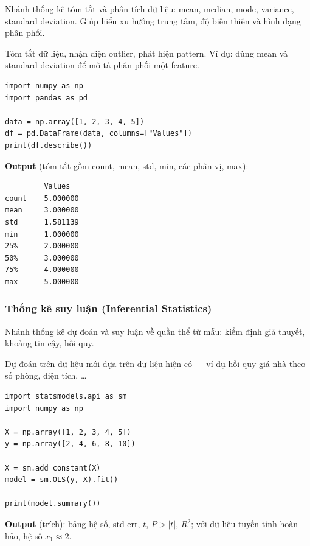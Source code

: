 \begin{ynghia}[title={Nội dung}]
Nhánh thống kê tóm tắt và phân tích dữ liệu: mean, median, mode, variance, standard deviation.
Giúp hiểu xu hướng trung tâm, độ biến thiên và hình dạng phân phối.
\end{ynghia}

\begin{phuongphap}[title={Ứng dụng trong ML}]
Tóm tắt dữ liệu, nhận diện outlier, phát hiện pattern.
Ví dụ: dùng mean và standard deviation để mô tả phân phối một feature.
\end{phuongphap}

\begin{vidu}[title={Tính thống kê mô tả với NumPy và Pandas}]
\begin{lstlisting}
import numpy as np
import pandas as pd

data = np.array([1, 2, 3, 4, 5])
df = pd.DataFrame(data, columns=["Values"])
print(df.describe())
\end{lstlisting}

\textbf{Output} (tóm tắt gồm count, mean, std, min, các phân vị, max):
\begin{lstlisting}
         Values
count    5.000000
mean     3.000000
std      1.581139
min      1.000000
25%      2.000000
50%      3.000000
75%      4.000000
max      5.000000
\end{lstlisting}
\end{vidu}

\subsubsection{Thống kê suy luận (Inferential Statistics)}

\begin{ynghia}[title={Nội dung}]
Nhánh thống kê dự đoán và suy luận về quần thể từ mẫu: kiểm định giả thuyết, khoảng tin cậy, hồi quy.
\end{ynghia}

\begin{phuongphap}[title={Ứng dụng trong ML}]
Dự đoán trên dữ liệu mới dựa trên dữ liệu hiện có --- ví dụ hồi quy giá nhà theo số phòng, diện tích, \ldots
\end{phuongphap}

\begin{vidu}[title={Hồi quy OLS với statsmodels}]
\begin{lstlisting}
import statsmodels.api as sm
import numpy as np

X = np.array([1, 2, 3, 4, 5])
y = np.array([2, 4, 6, 8, 10])

X = sm.add_constant(X)
model = sm.OLS(y, X).fit()

print(model.summary())
\end{lstlisting}

\textbf{Output} (trích): bảng hệ số, std err, $t$, $P>|t|$, $R^2$; với dữ liệu tuyến tính hoàn hảo, hệ số $x_1 \approx 2$.
\end{vidu}
